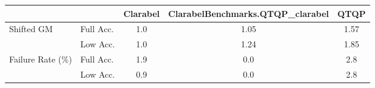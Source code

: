 \begin{tabular}{|l|l|c|c|c|}
  \hline
   &  & \textbf{Clarabel} & \textbf{ClarabelBenchmarks.QTQP\_clarabel} & \textbf{QTQP} \\
  \hline
  Shifted GM & Full Acc. & 1.0 & 1.05 & 1.57 \\
   & Low Acc. & 1.0 & 1.24 & 1.85 \\
  Failure Rate (\%) & Full Acc. & 1.9 & 0.0 & 2.8 \\
   & Low Acc. & 0.9 & 0.0 & 2.8 \\
  \hline
\end{tabular}
